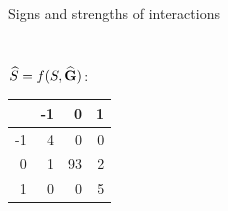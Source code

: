 \documentclass[11pt]{beamer}
\newcommand\Gb{{\bf G}}
\begin{document}
\begin{frame}{Signs and strengths of interactions}
{\begin{columns}
\begin{column}{0.3\linewidth}
\begin{table}[ht]
\begin{tabular}{r|rrr}
\end{tabular}
\end{table}
$\widehat{S} =f(S,\widehat{\Gb})$:
\begin{table}[ht]
\centering
\begin{tabular}{r|rrr}

 & -1 & 0 & 1 \\ 
  \hline
-1 &   4 &   0 &   0 \\ 
  0 &   1 &  93 &   2 \\ 
  1 &   0 &   0 &   5 \\ 

\end{tabular}
\end{table}
     \end{column}
  \end{columns}}
          
 \end{frame}
\end{document}
